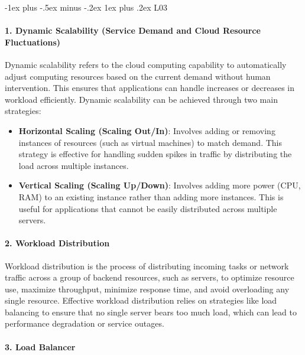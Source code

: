 \documentclass[10pt, landscape]{article}
\makeatletter
\renewcommand{\subsubsection}{\@startsection{subsubsection}{3}{0mm}%
  {-1ex plus -.5ex minus -.2ex}%
  {1ex plus .2ex}%
{\normalfont\small\bfseries}}%
\makeatother
\begin{document}
\begin{multicols*}{4}
\subsubsection{L03}\label{l03}

\paragraph{1. Dynamic Scalability (Service Demand and Cloud Resource
Fluctuations)}\label{dynamic-scalability-service-demand-and-cloud-resource-fluctuations}

Dynamic scalability refers to the cloud computing capability to
automatically adjust computing resources based on the current demand
without human intervention. This ensures that applications can handle
increases or decreases in workload efficiently. Dynamic scalability can
be achieved through two main strategies:

\begin{itemize}
\tightlist
\item
  \textbf{Horizontal Scaling (Scaling Out/In)}: Involves adding or
  removing instances of resources (such as virtual machines) to match
  demand. This strategy is effective for handling sudden spikes in
  traffic by distributing the load across multiple instances.
\item
  \textbf{Vertical Scaling (Scaling Up/Down)}: Involves adding more
  power (CPU, RAM) to an existing instance rather than adding more
  instances. This is useful for applications that cannot be easily
  distributed across multiple servers.
\end{itemize}

\paragraph{2. Workload Distribution}\label{workload-distribution-1}

Workload distribution is the process of distributing incoming tasks or
network traffic across a group of backend resources, such as servers, to
optimize resource use, maximize throughput, minimize response time, and
avoid overloading any single resource. Effective workload distribution
relies on strategies like load balancing to ensure that no single server
bears too much load, which can lead to performance degradation or
service outages.

\paragraph{3. Load Balancer}\label{load-balancer}


\end{multicols*}
\end{document}
